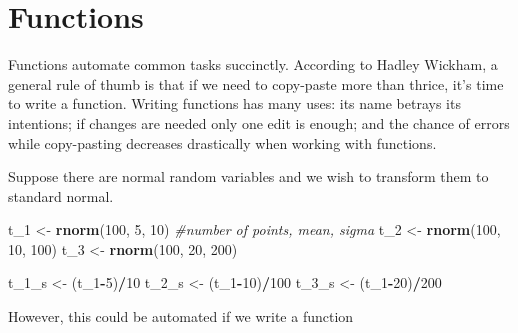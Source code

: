\documentclass[12pt,]{article}
\newenvironment{Shaded}{\begin{snugshade}}{\end{snugshade}}
\newcommand{\KeywordTok}[1]{\textcolor[rgb]{0.13,0.29,0.53}{\textbf{#1}}}
\newcommand{\DecValTok}[1]{\textcolor[rgb]{0.00,0.00,0.81}{#1}}
\newcommand{\StringTok}[1]{\textcolor[rgb]{0.31,0.60,0.02}{#1}}
\newcommand{\CommentTok}[1]{\textcolor[rgb]{0.56,0.35,0.01}{\textit{#1}}}
\newcommand{\ControlFlowTok}[1]{\textcolor[rgb]{0.13,0.29,0.53}{\textbf{#1}}}
\newcommand{\OperatorTok}[1]{\textcolor[rgb]{0.81,0.36,0.00}{\textbf{#1}}}
\newcommand{\NormalTok}[1]{#1}
\begin{document}
\section{Functions}\label{functions}

Functions automate common tasks succinctly. According to Hadley Wickham,
a general rule of thumb is that if we need to copy-paste more than
thrice, it's time to write a function. Writing functions has many uses:
its name betrays its intentions; if changes are needed only one edit is
enough; and the chance of errors while copy-pasting decreases
drastically when working with functions.

Suppose there are normal random variables and we wish to transform them
to standard normal.

\begin{Shaded}
\begin{Highlighting}[]
\NormalTok{t_}\DecValTok{1}\NormalTok{ <-}\StringTok{ }\KeywordTok{rnorm}\NormalTok{(}\DecValTok{100}\NormalTok{, }\DecValTok{5}\NormalTok{, }\DecValTok{10}\NormalTok{) }\CommentTok{#number of points, mean, sigma}
\NormalTok{t_}\DecValTok{2}\NormalTok{ <-}\StringTok{ }\KeywordTok{rnorm}\NormalTok{(}\DecValTok{100}\NormalTok{, }\DecValTok{10}\NormalTok{, }\DecValTok{100}\NormalTok{)}
\NormalTok{t_}\DecValTok{3}\NormalTok{ <-}\StringTok{ }\KeywordTok{rnorm}\NormalTok{(}\DecValTok{100}\NormalTok{, }\DecValTok{20}\NormalTok{, }\DecValTok{200}\NormalTok{)}

\NormalTok{t_1_s <-}\StringTok{ }\NormalTok{(t_}\DecValTok{1}\OperatorTok{-}\DecValTok{5}\NormalTok{)}\OperatorTok{/}\DecValTok{10} 
\NormalTok{t_2_s <-}\StringTok{ }\NormalTok{(t_}\DecValTok{1}\OperatorTok{-}\DecValTok{10}\NormalTok{)}\OperatorTok{/}\DecValTok{100}
\NormalTok{t_3_s <-}\StringTok{ }\NormalTok{(t_}\DecValTok{1}\OperatorTok{-}\DecValTok{20}\NormalTok{)}\OperatorTok{/}\DecValTok{200}
\end{Highlighting}
\end{Shaded}

However, this could be automated if we write a function

\begin{Shaded}
\end{Shaded}
\end{document}
